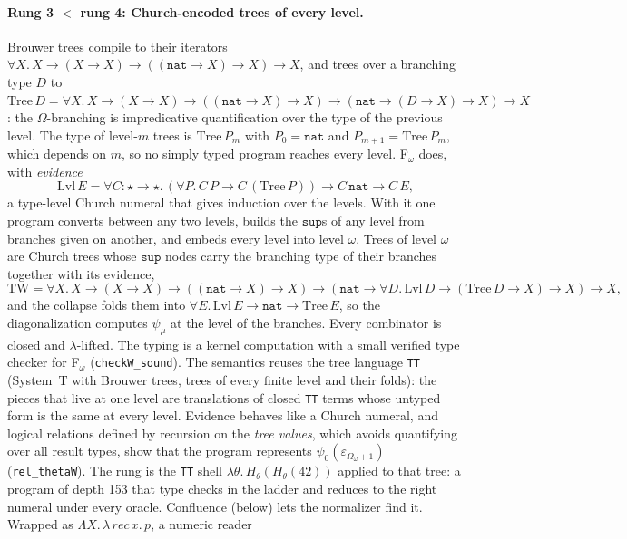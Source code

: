 \documentclass[11pt]{article}
\theoremstyle{definition}
\theoremstyle{remark}
\newcommand{\lean}[1]{\texttt{#1}}
\begin{document}
\paragraph{Rung 3 $<$ rung 4: Church-encoded trees of every level.} Brouwer
trees compile to their iterators $\forall X.\,X\to(X\to X)\to((\mathtt{nat}\to
X)\to X)\to X$, and trees over a branching type $D$ to
$\mathrm{Tree}\,D=\forall X.\,X\to(X\to X)\to((\mathtt{nat}\to X)\to X)\to
(\mathtt{nat}\to(D\to X)\to X)\to X$: the $\Omega$-branching is impredicative
quantification over the type of the previous level. The type of level-$m$
trees is $\mathrm{Tree}\,P_m$ with $P_0=\mathtt{nat}$ and
$P_{m+1}=\mathrm{Tree}\,P_m$, which depends on $m$, so no simply typed program
reaches every level. F$_\omega$ does, with \emph{evidence}
\[
\mathrm{Lvl}\,E=\forall C{:}\star\to\star.\,(\forall P.\,C\,P\to C\,(\mathrm{Tree}\,P))\to C\,\mathtt{nat}\to C\,E,
\]
a type-level Church numeral that gives induction over the levels. With it one
program converts between any two levels, builds the $\mathtt{sup}$s of any
level from branches given on another, and embeds every level into level
$\omega$. Trees of level $\omega$ are Church trees whose $\mathtt{sup}$ nodes
carry the branching type of their branches together with its evidence,
\[
\mathrm{TW}=\forall X.\,X\to(X\to X)\to((\mathtt{nat}\to X)\to X)\to
(\mathtt{nat}\to\forall D.\,\mathrm{Lvl}\,D\to(\mathrm{Tree}\,D\to X)\to X)\to X,
\]
and the collapse folds them into $\forall E.\,\mathrm{Lvl}\,E\to\mathtt{nat}\to
\mathrm{Tree}\,E$, so the diagonalization computes $\psi_\mu$ at the level of
the branches. Every combinator is closed and $\lambda$-lifted. The typing is a
kernel computation with a small verified type checker for F$_\omega$
(\lean{checkW\_sound}). The semantics reuses the tree language \lean{TT}
(System~T with Brouwer trees, trees of every finite level and their folds): the
pieces that live at one level are translations of closed \lean{TT} terms whose
untyped form is the same at every level. Evidence behaves like a Church
numeral, and logical relations defined by recursion on the \emph{tree values},
which avoids quantifying over all result types, show that the program
represents $\psi_0(\varepsilon_{\Omega_\omega+1})$ (\lean{rel\_thetaW}). The
rung is the \lean{TT} shell $\lambda\theta.\,H_\theta(H_\theta(42))$ applied to
that tree: a program of depth 153 that type checks in the ladder and reduces to
the right numeral under every oracle. Confluence (below) lets the normalizer find
it. Wrapped as $\Lambda X.\,\lambda\,\mathit{rec}\,x.\,p$, a numeric reader
\end{document}
